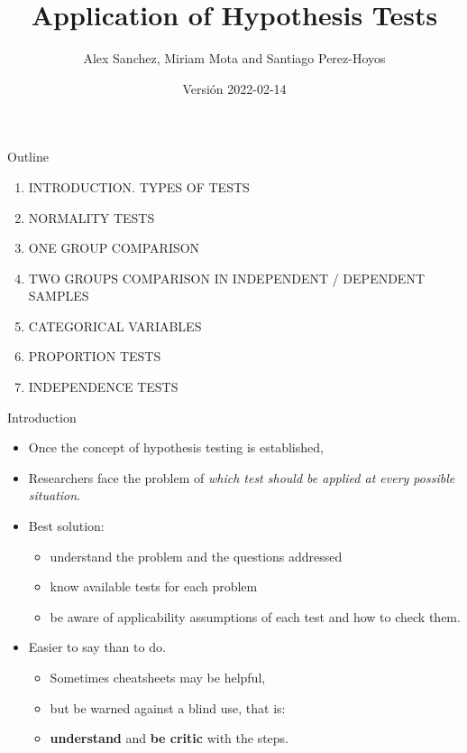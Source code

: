 \documentclass[
  ignorenonframetext,
]{beamer}
\title{Application of Hypothesis Tests}
\author{Alex Sanchez, Miriam Mota and Santiago Perez-Hoyos}
\date{Versión 2022-02-14}
\institute{Statistics and Bioinformatics Unit. Vall d'Hebron Institut de
Recerca}
\providecommand{\tightlist}{%
  \setlength{\itemsep}{0pt}\setlength{\parskip}{0pt}}
\begin{document}
\frame{\titlepage}

\begin{frame}{Outline}
\protect\hypertarget{outline}{}
\begin{enumerate}
\tightlist
\item
  INTRODUCTION. TYPES OF TESTS
\item
  NORMALITY TESTS
\item
  ONE GROUP COMPARISON
\item
  TWO GROUPS COMPARISON IN INDEPENDENT / DEPENDENT SAMPLES
\item
  CATEGORICAL VARIABLES
\item
  PROPORTION TESTS
\item
  INDEPENDENCE TESTS
\end{enumerate}
\end{frame}

\begin{frame}{Introduction}
\protect\hypertarget{introduction}{}
\begin{itemize}
\tightlist
\item
  Once the concept of hypothesis testing is established,
\item
  Researchers face the problem of \emph{which test should be applied at
  every possible situation}.
\item
  Best solution:

  \begin{itemize}
  \tightlist
  \item
    understand the problem and the questions addressed
  \item
    know available tests for each problem
  \item
    be aware of applicability assumptions of each test and how to check
    them.
  \end{itemize}
\item
  Easier to say than to do.

  \begin{itemize}
  \tightlist
  \item
    Sometimes cheatsheets may be helpful,
  \item
    but be warned against a blind use, that is:
  \item
    \textbf{understand} and \textbf{be critic} with the steps.
  \end{itemize}
\end{itemize}
\end{frame}
\end{document}
